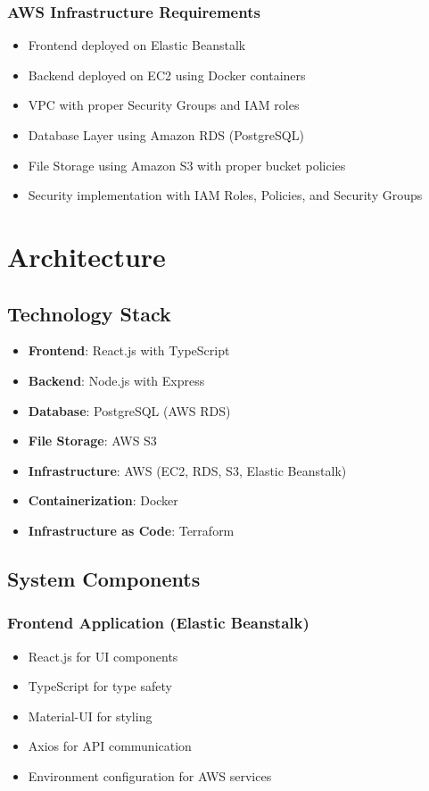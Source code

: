 \documentclass[12pt,a4paper]{article}
\begin{document}
\subsubsection{AWS Infrastructure Requirements}
\begin{itemize}
    \item Frontend deployed on Elastic Beanstalk
    \item Backend deployed on EC2 using Docker containers
    \item VPC with proper Security Groups and IAM roles
    \item Database Layer using Amazon RDS (PostgreSQL)
    \item File Storage using Amazon S3 with proper bucket policies
    \item Security implementation with IAM Roles, Policies, and Security Groups
\end{itemize}

\section{Architecture}

\subsection{Technology Stack}
\begin{itemize}
    \item \textbf{Frontend}: React.js with TypeScript
    \item \textbf{Backend}: Node.js with Express
    \item \textbf{Database}: PostgreSQL (AWS RDS)
    \item \textbf{File Storage}: AWS S3
    \item \textbf{Infrastructure}: AWS (EC2, RDS, S3, Elastic Beanstalk)
    \item \textbf{Containerization}: Docker
    \item \textbf{Infrastructure as Code}: Terraform
\end{itemize}

\subsection{System Components}

\subsubsection{Frontend Application (Elastic Beanstalk)}
\begin{itemize}
    \item React.js for UI components
    \item TypeScript for type safety
    \item Material-UI for styling
    \item Axios for API communication
    \item Environment configuration for AWS services
\end{itemize}
\end{document}
